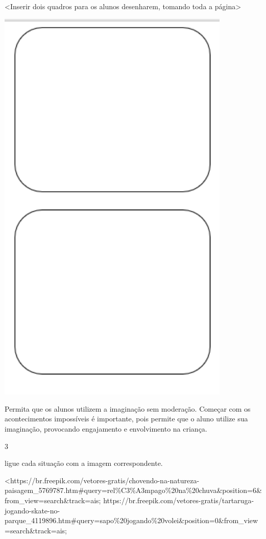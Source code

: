 \textless{}Inserir dois quadros para os alunos desenharem, tomando toda
a página\textgreater{}

\includegraphics[width=4.38938in,height=7.65199in]{media/image81.png}

Permita que os alunos utilizem a
imaginação sem moderação. Começar com os acontecimentos
impossíveis é importante, pois permite que o aluno utilize sua
imaginação, provocando engajamento e envolvimento na criança.

\num{3}

ligue cada situação com a imagem correspondente.

\textless{}https://br.freepik.com/vetores-gratis/chovendo-na-natureza-paisagem\_5769787.htm\#query=rel\%C3\%A3mpago\%20na\%20chuva\&position=6\&from\_view=search\&track=ais;
https://br.freepik.com/vetores-gratis/tartaruga-jogando-skate-no-parque\_4119896.htm\#query=sapo\%20jogando\%20volei\&position=0\&from\_view=search\&track=ais;

